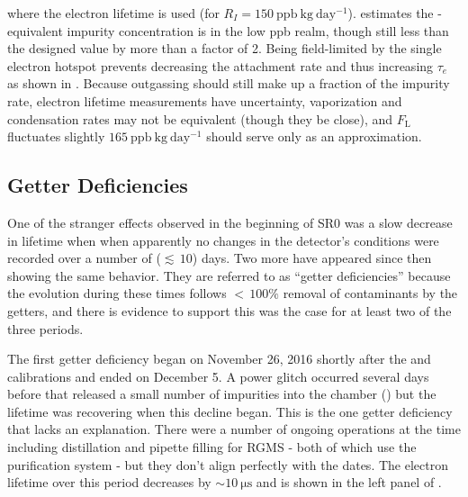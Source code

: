 \noindent where the \alphadecay electron lifetime is used (for
\metakr $R_I = 150\ \mathrm{ppb\ kg\ day^{-1}}$).   estimates the -equivalent
impurity concentration is in the low ppb realm, though still less than the designed value by more than a factor of 2.  Being field-limited
by the single electron hotspot prevents decreasing the attachment rate and thus increasing $\tau_e$ as shown in
.  Because outgassing should still make up a fraction
of the impurity rate, electron lifetime measurements
have uncertainty, vaporization and condensation rates may not be equivalent (though they be close), and $F_{\mathrm{L}}$ fluctuates
slightly $165\ \mathrm{ppb\ kg\ day^{-1}}$ should serve only as an approximation.



\subsection{Getter Deficiencies}
\label{subsec:electron_lifetime_model_detector_effects_getter}
One of the stranger effects observed in the beginning of SR0 was a slow decrease in lifetime when when apparently no changes in the
detector's conditions were recorded over a number of (${\lesssim}\, 10$) days.  Two more have appeared since then showing the same
behavior.  They are referred to as ``getter deficiencies'' because the evolution during these times follows ${<}\, 100\%$ removal of
contaminants by the getters, and there is evidence to support this was the case for at least two of the three periods.

The first getter deficiency
began on November 26, 2016 shortly after the \ambe and \metakr calibrations and ended on December 5.  A power glitch occurred several
days before that released a small number of impurities into the chamber
() but the lifetime was recovering when this decline
began.  This is the one getter deficiency that lacks an explanation.  There were a number of ongoing operations
at the time including  distillation and pipette filling for RGMS - both of which use the purification system - but they don't
align perfectly with the dates.  The electron lifetime over this period decreases by ${\sim}10\ \mathrm{\mu s}$ and is shown in the left
panel of .

